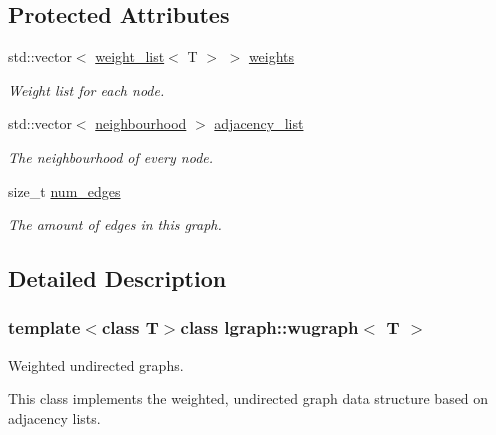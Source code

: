 \subsection*{Protected Attributes}
\begin{DoxyCompactItemize}
\item 
std\-::vector$<$ \hyperlink{namespacelgraph_a1e0fd5ef0a78b2a92da48adbed265cb6}{weight\-\_\-list}$<$ T $>$ $>$ \hyperlink{classlgraph_1_1wxgraph_a6f8c983edc82913c2d78b7bc871defe8}{weights}
\begin{DoxyCompactList}\small\item\em Weight list for each node. \end{DoxyCompactList}\item 
\hypertarget{classlgraph_1_1xxgraph_a31cf82d0b20be05290be259dc97a51ec}{std\-::vector$<$ \hyperlink{namespacelgraph_a052e7766c13f3a43cec0aec8173fdede}{neighbourhood} $>$ \hyperlink{classlgraph_1_1xxgraph_a31cf82d0b20be05290be259dc97a51ec}{adjacency\-\_\-list}}\label{classlgraph_1_1xxgraph_a31cf82d0b20be05290be259dc97a51ec}

\begin{DoxyCompactList}\small\item\em The neighbourhood of every node. \end{DoxyCompactList}\item 
\hypertarget{classlgraph_1_1xxgraph_a6765a9a3be42f6e0f824635c593b35d7}{size\-\_\-t \hyperlink{classlgraph_1_1xxgraph_a6765a9a3be42f6e0f824635c593b35d7}{num\-\_\-edges}}\label{classlgraph_1_1xxgraph_a6765a9a3be42f6e0f824635c593b35d7}

\begin{DoxyCompactList}\small\item\em The amount of edges in this graph. \end{DoxyCompactList}\end{DoxyCompactItemize}


\subsection{Detailed Description}
\subsubsection*{template$<$class T$>$class lgraph\-::wugraph$<$ T $>$}

Weighted undirected graphs. 

This class implements the weighted, undirected graph data structure based on adjacency lists.


